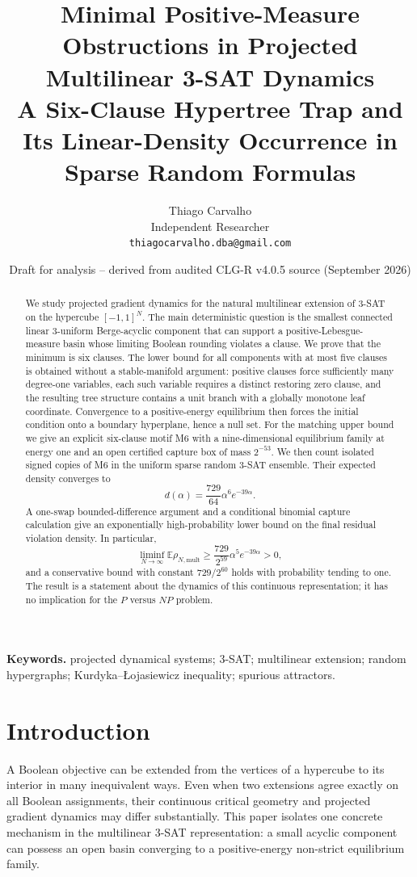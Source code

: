 \documentclass[11pt,a4paper]{article}
\title{\textbf{Minimal Positive-Measure Obstructions in Projected Multilinear 3-SAT Dynamics}\\[0.3em]\large A Six-Clause Hypertree Trap and Its Linear-Density Occurrence in Sparse Random Formulas}
\author{Thiago Carvalho\\Independent Researcher\\\texttt{thiagocarvalho.dba@gmail.com}}
\date{Draft for analysis -- derived from audited CLG-R v4.0.5 source (September 2026)}
\begin{document}
\maketitle
\begin{abstract}
We study projected gradient dynamics for the natural multilinear extension of 3-SAT on the hypercube $[-1,1]^N$. The main deterministic question is the smallest connected linear 3-uniform Berge-acyclic component that can support a positive-Lebesgue-measure basin whose limiting Boolean rounding violates a clause. We prove that the minimum is six clauses. The lower bound for all components with at most five clauses is obtained without a stable-manifold argument: positive clauses force sufficiently many degree-one variables, each such variable requires a distinct restoring zero clause, and the resulting tree structure contains a unit branch with a globally monotone leaf coordinate. Convergence to a positive-energy equilibrium then forces the initial condition onto a boundary hyperplane, hence a null set. For the matching upper bound we give an explicit six-clause motif M6 with a nine-dimensional equilibrium family at energy one and an open certified capture box of mass $2^{-53}$. We then count isolated signed copies of M6 in the uniform sparse random 3-SAT ensemble. Their expected density converges to
\[
d(\alpha)=\frac{729}{64}\alpha^6e^{-39\alpha}.
\]
A one-swap bounded-difference argument and a conditional binomial capture calculation give an exponentially high-probability lower bound on the final residual violation density. In particular,
\[
\liminf_{N\to\infty}\mathbb E\rho_{N,\mathrm{mult}}\ge\frac{729}{2^{59}}\alpha^5e^{-39\alpha}>0,
\]
and a conservative bound with constant $729/2^{60}$ holds with probability tending to one. The result is a statement about the dynamics of this continuous representation; it has no implication for the $P$ versus $NP$ problem.
\end{abstract}
\noindent\textbf{Keywords.} projected dynamical systems; 3-SAT; multilinear extension; random hypergraphs; Kurdyka--\L{}ojasiewicz inequality; spurious attractors.
\section{Introduction}
A Boolean objective can be extended from the vertices of a hypercube to its interior in many inequivalent ways. Even when two extensions agree exactly on all Boolean assignments, their continuous critical geometry and projected gradient dynamics may differ substantially. This paper isolates one concrete mechanism in the multilinear 3-SAT representation: a small acyclic component can possess an open basin converging to a positive-energy non-strict equilibrium family.
\end{document}
